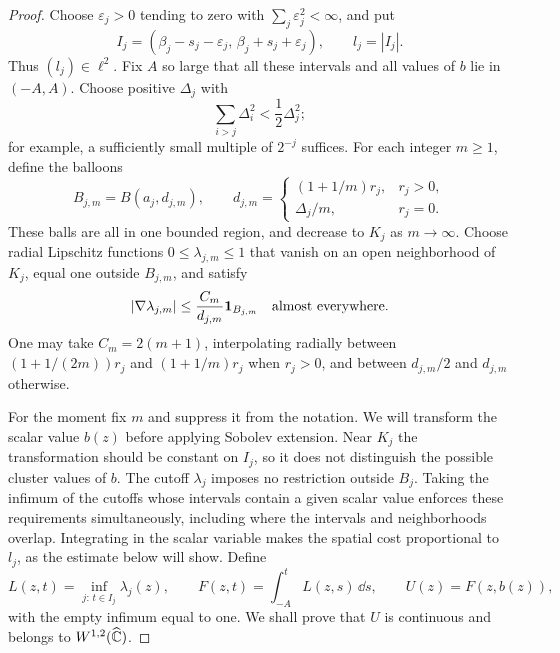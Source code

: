 \begin{proof}
Choose $\varepsilon_j>0$ tending to zero with
$\sum_j\varepsilon_j^2<\infty$, and put
\[
 I_j=(\beta_j-s_j-\varepsilon_j,\,
          \beta_j+s_j+\varepsilon_j),\qquad l_j=|I_j|.
\]
Thus $(l_j)\in\ell^2$.  Fix $A$ so large that all these intervals and
all values of $b$ lie in $(-A,A)$.  Choose positive $\Delta_j$ with
\begin{equation}\label{eq:trace-small-radii}
 \sum_{i>j}\Delta_i^2<\frac12\Delta_j^2;
\end{equation}
for example, a sufficiently small multiple of $2^{-j}$ suffices.
For each integer $m\geq1$, define the balloons
\[
 B_{j,m}=B(a_j,d_{j,m}),\qquad
 d_{j,m}=
 \begin{cases}
  (1+1/m)r_j,&r_j>0,\\
  \Delta_j/m,&r_j=0.
 \end{cases}
\]
These balls are all in one bounded region, and decrease to $K_j$ as
$m\to\infty$.  Choose radial Lipschitz functions
$0\leq\lambda_{j,m}\leq1$ that vanish on an open neighborhood of
$K_j$, equal one outside $B_{j,m}$, and satisfy
\begin{equation}\label{eq:trace-cutoff-gradient}
 |\nabla\lambda_{j,m}|
 \leq\frac{C_m}{d_{j,m}}{\bf1}_{B_{j,m}}
 \quad\hbox{almost everywhere}.
\end{equation}
One may take $C_m=2(m+1)$, interpolating radially between
$(1+1/(2m))r_j$ and $(1+1/m)r_j$ when $r_j>0$, and between
$d_{j,m}/2$ and $d_{j,m}$ otherwise.

For the moment fix $m$ and suppress it from the notation.  We will
transform the scalar value $b(z)$ before applying Sobolev extension.
Near $K_j$ the transformation should be constant on $I_j$, so it does
not distinguish the possible cluster values of $b$.  The cutoff
$\lambda_j$ imposes no restriction outside $B_j$.  Taking the
infimum of the cutoffs whose intervals contain a given scalar value
enforces these requirements simultaneously, including where the
intervals and neighborhoods overlap.  Integrating in the scalar
variable makes the spatial cost proportional to $l_j$, as the
estimate below will show.  Define
\begin{equation}\label{eq:trace-mask}
 L(z,t)=\inf_{j:\,t\in I_j}\lambda_j(z),\qquad
 F(z,t)=\int_{-A}^{t}L(z,s)\,\dd s,\qquad U(z)=F(z,b(z)),
\end{equation}
with the empty infimum equal to one.  We shall prove that $U$ is
continuous and belongs to $W^{1,2}(\widehat{\mathbb C})$.


\end{proof}
